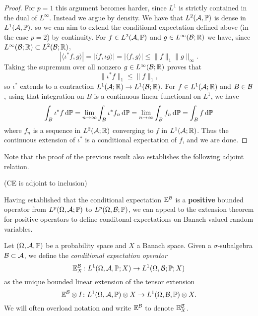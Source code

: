\begin{proof}
  For $p = 1$ this argument becomes harder, since $L^1$ is strictly contained in the dual of $L^\infty$.
  Instead we argue by density.
  We have that $L^2(\mathcal{A},\mathbb{P})$ is dense in $L^1(\mathcal{A},\mathbb{P})$, so we can aim to extend the conditional expectation defined above (in the case $p=2$) by continuity.
  For $f \in L^2(\mathcal{A},\mathbb{P})$ and $g \in L^\infty(\mathcal{B};\mathbb{R})$ we have, since $L^\infty(\mathcal{B};\mathbb{R}) \subset L^2(\mathcal{B};\mathbb{R})$,
  \begin{equation*}
    |\langle \iota^* f, g \rangle| = |\langle f, \iota g \rangle| = |\langle f, g \rangle| \leq \|f\|_1 \|g\|_\infty.
  \end{equation*}
  Taking the supremum over all nonzero $g \in L^\infty(\mathcal{B};\mathbb{R})$ proves that
  \begin{equation*}
    \|\iota^* f\|_1 \leq \|f\|_1,
  \end{equation*}
  so $\iota^*$ extends to a contraction $L^1(\mathcal{A};\mathbb{R}) \to L^1(\mathcal{B};\mathbb{R})$.
  For $f \in L^1(\mathcal{A};\mathbb{R})$ and $B \in \mathcal{B}$, using that integration on $B$ is a continuous linear functional on $L^1$, we have
  \begin{equation*}
    \int_B \iota^* f \, \mathrm{d}\mathbb{P}
    = \lim_{n \to \infty} \int_B \iota^* f_n \, \mathrm{d}\mathbb{P}
    = \lim_{n \to \infty} \int_B  f_n \, \mathrm{d}\mathbb{P}
    = \int_B f \, \mathrm{d}\mathbb{P}
  \end{equation*}
  where $f_n$ is a sequence in $L^2(\mathcal{A};\mathbb{R})$ converging to $f$ in $L^1(\mathcal{A};\mathbb{R})$.
  Thus the continuous extension of $\iota^*$ is a conditional expectation of $f$, and we are done.
\end{proof}

Note that the proof of the previous result also establishes the following adjoint relation.

\begin{prop}
  (CE is adjoint to inclusion)
\end{prop}


Having established that the conditional expectation $\mathbb{E}^{\mathcal{B}}$ is a \textbf{positive} bounded operator from $L^p(\Omega, \mathcal{A};\mathbb{P})$ to $L^p(\Omega,\mathcal{B};\mathbb{P})$, we can appeal to the extension theorem for positive operators to define conditonal expectations on Banach-valued random variables.

\begin{defn}
  Let $(\Omega,\mathcal{A},\mathbb{P})$ be a probability space and $X$ a Banach space.
  Given a $\sigma$-subalgebra $\mathcal{B} \subset \mathcal{A}$, we define the \emph{conditional expectation operator}
  \begin{equation*}
    \mathbb{E}_X^{\mathcal{B}} \colon L^1(\Omega,\mathcal{A},\mathbb{P};X) \rightarrow L^1(\Omega,\mathcal{B};\mathbb{P};X) 
  \end{equation*}
  as the unique bounded linear extension of the tensor extension
  \begin{equation*}
    \mathbb{E}^{\mathcal{B}} \otimes I \colon L^1(\Omega,\mathcal{A},\mathbb{P}) \otimes X \rightarrow L^1(\Omega,\mathcal{B},\mathbb{P}) \otimes X.
  \end{equation*}
  We will often overload notation and write $\mathbb{E}^{\mathcal{B}}$ to denote $\mathbb{E}_X^{\mathcal{B}}$.
\end{defn}

